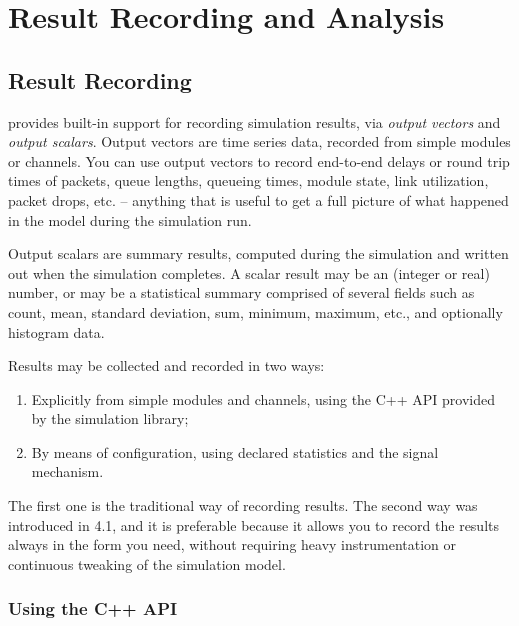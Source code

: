 \chapter{Result Recording and Analysis}
\label{cha:analyzing-simulation-results}


\section{Result Recording}

{\opp} provides built-in support for recording simulation results, via
\textit{output vectors} and \textit{output scalars}. Output vectors are
time series data, recorded from simple modules or channels. You can use
output vectors to record end-to-end delays or round trip times of packets,
queue lengths, queueing times, module state, link utilization, packet
drops, etc. -- anything that is useful to get a full picture of what
happened in the model during the simulation run.

Output scalars are summary results, computed during the simulation and
written out when the simulation completes. A scalar result may be an
(integer or real) number, or may be a statistical summary comprised of
several fields such as count, mean, standard deviation, sum, minimum,
maximum, etc., and optionally histogram data.

Results may be collected and recorded in two ways:

\begin{enumerate}
  \item Explicitly from simple modules and channels, using the C++ API
    provided by the simulation library;
  \item By means of configuration, using declared statistics and the
    signal mechanism.
\end{enumerate}

The first one is the traditional way of recording results. The second way
was introduced in {\opp} 4.1, and it is preferable because it allows you
to record the results always in the form you need, without requiring heavy
instrumentation or continuous tweaking of the simulation model.

\subsection{Using the C++ API}

